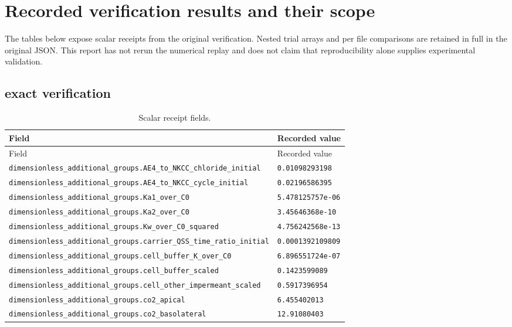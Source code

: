 \section{Recorded verification results and their scope}
The tables below expose scalar receipts from the original verification. Nested trial arrays and per file comparisons are retained in full in the original JSON. This report has not rerun the numerical replay and does not claim that reproducibility alone supplies experimental validation.
\subsection*{exact verification}

\begingroup\scriptsize
\setlength{\tabcolsep}{3pt}
\begin{longtable}{p{.46\linewidth}p{.46\linewidth}}
\caption{Scalar receipt fields.}\\
\toprule
Field & Recorded value \\
\midrule\endfirsthead
\toprule
Field & Recorded value \\
\midrule\endhead
\bottomrule\endfoot
\nolinkurl{dimensionless_additional_groups.AE4_to_NKCC_chloride_initial} & \texttt{0.01098293198} \\
\nolinkurl{dimensionless_additional_groups.AE4_to_NKCC_cycle_initial} & \texttt{0.02196586395} \\
\nolinkurl{dimensionless_additional_groups.Ka1_over_C0} & \texttt{5.478125757e-06} \\
\nolinkurl{dimensionless_additional_groups.Ka2_over_C0} & \texttt{3.45646368e-10} \\
\nolinkurl{dimensionless_additional_groups.Kw_over_C0_squared} & \texttt{4.756242568e-13} \\
\nolinkurl{dimensionless_additional_groups.carrier_QSS_time_ratio_initial} & \texttt{0.0001392109809} \\
\nolinkurl{dimensionless_additional_groups.cell_buffer_K_over_C0} & \texttt{6.896551724e-07} \\
\nolinkurl{dimensionless_additional_groups.cell_buffer_scaled} & \texttt{0.1423599089} \\
\nolinkurl{dimensionless_additional_groups.cell_other_impermeant_scaled} & \texttt{0.5917396954} \\
\nolinkurl{dimensionless_additional_groups.co2_apical} & \texttt{6.455402013} \\
\nolinkurl{dimensionless_additional_groups.co2_basolateral} & \texttt{12.91080403} \\

\end{longtable}
